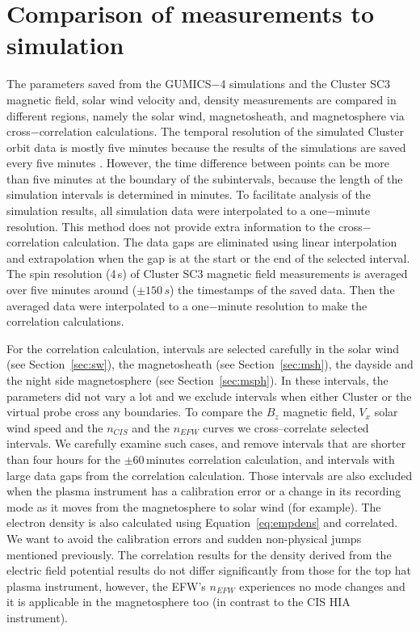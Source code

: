 \documentclass[draft]{agujournal2019}
\begin{document}
\section{Comparison of measurements to simulation}
\label{sec:comp}

The parameters saved from the GUMICS$-$4 simulations and the Cluster SC3 magnetic field, solar wind velocity and, density measurements are compared in different regions, namely the solar wind, magnetosheath, and magnetosphere via cross$-$correlation calculations. The temporal resolution of the simulated Cluster orbit data is mostly five minutes because the results of the simulations are saved every five minutes \cite{facsko16:_one_earth}. However, the time difference between points can be more than five minutes at the boundary of the subintervals, because the length of the simulation intervals is determined in minutes. To facilitate analysis of the simulation results, all simulation data were interpolated to a one$-$minute resolution. This method does not provide extra information to the cross$-$correlation calculation. The data gaps are eliminated using linear interpolation and extrapolation when the gap is at the start or the end of the selected interval. The spin resolution (4\,s) of Cluster SC3 magnetic field measurements is averaged over five minutes around ($\pm150\,s$) the timestamps of the saved data. Then the averaged data were interpolated to a one$-$minute resolution to make the correlation calculations.

For the correlation calculation, intervals are selected carefully in the solar wind (see Section~\ref{sec:sw}), the magnetosheath (see Section~\ref{sec:msh}), the dayside and the night side magnetosphere (see Section~\ref{sec:msph}). In these intervals, the parameters did not vary a lot and we exclude intervals when either Cluster or the virtual probe cross any boundaries. To compare the $B_z$ magnetic field, $V_x$ solar wind speed and the $n_{CIS}$ and the $n_{EFW}$ curves we cross--correlate selected intervals. We carefully examine such cases, and remove intervals that are shorter than four hours for the $\pm$60\,minutes correlation calculation, and intervals with large data gaps from the correlation calculation. Those intervals are also excluded when the plasma instrument has a calibration error or a change in its recording mode as it moves from the magnetosphere to solar wind (for example). The electron density is also calculated using Equation~\ref{eq:empdens} and correlated. We want to avoid the calibration errors and sudden non-physical jumps mentioned previously. The correlation results for the density derived from the electric field potential results do not differ significantly from those for the top hat plasma instrument, however, the EFW's $n_{EFW}$ experiences no mode changes and it is applicable in the magnetosphere too (in contrast to the CIS HIA instrument).
\end{document}
